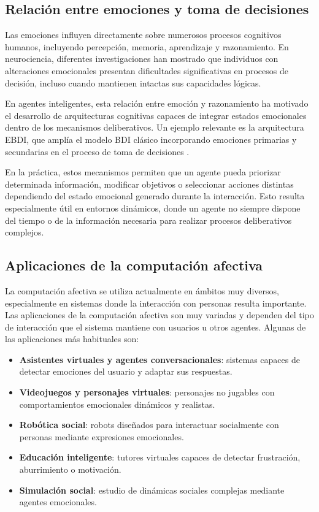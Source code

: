 \subsection{Relación entre emociones y toma de decisiones}

Las emociones influyen directamente sobre numerosos procesos cognitivos humanos, incluyendo percepción, memoria, aprendizaje y razonamiento. En neurociencia, diferentes investigaciones han mostrado que individuos con alteraciones emocionales presentan dificultades significativas en procesos de decisión, incluso cuando mantienen intactas sus capacidades lógicas.

En agentes inteligentes, esta relación entre emoción y razonamiento ha motivado el desarrollo de arquitecturas cognitivas capaces de integrar estados emocionales dentro de los mecanismos deliberativos. Un ejemplo relevante es la arquitectura EBDI, que amplía el modelo BDI clásico incorporando emociones primarias y secundarias en el proceso de toma de decisiones \cite{jiang2007ebdi}.

En la práctica, estos mecanismos permiten que un agente pueda priorizar determinada información, modificar objetivos o seleccionar acciones distintas dependiendo del estado emocional generado durante la interacción. Esto resulta especialmente útil en entornos dinámicos, donde un agente no siempre dispone del tiempo o de la información necesaria para realizar procesos deliberativos complejos.

\subsection{Aplicaciones de la computación afectiva}

La computación afectiva se utiliza actualmente en ámbitos muy diversos, especialmente en sistemas donde la interacción con personas resulta importante. Las aplicaciones de la computación afectiva son muy variadas y dependen del tipo de interacción que el sistema mantiene con usuarios u otros agentes. Algunas de las aplicaciones más habituales son:

\begin{itemize}
    \item \textbf{Asistentes virtuales y agentes conversacionales}: sistemas capaces de detectar emociones del usuario y adaptar sus respuestas.
    
    \item \textbf{Videojuegos y personajes virtuales}: personajes no jugables con comportamientos emocionales dinámicos y realistas.
    
    \item \textbf{Robótica social}: robots diseñados para interactuar socialmente con personas mediante expresiones emocionales.
    
    \item \textbf{Educación inteligente}: tutores virtuales capaces de detectar frustración, aburrimiento o motivación.
    
    \item \textbf{Simulación social}: estudio de dinámicas sociales complejas mediante agentes emocionales.
\end{itemize}


